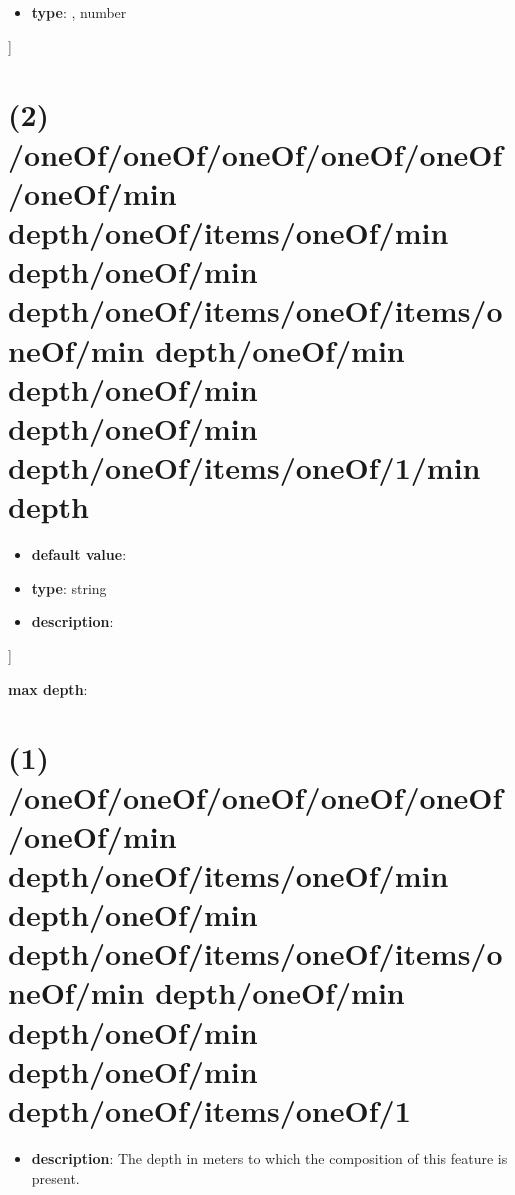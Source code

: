 \begin{itemize}[leftmargin=7em]\item {\bf type}: , number\end{itemize}]\section{(2) /oneOf/oneOf/oneOf/oneOf/oneOf/oneOf/min depth/oneOf/items/oneOf/min depth/oneOf/min depth/oneOf/items/oneOf/items/oneOf/min depth/oneOf/min depth/oneOf/min depth/oneOf/min depth/oneOf/items/oneOf/1/min depth}
\begin{itemize}[leftmargin=2em]\item {\bf default value}: 
\item {\bf type}: string
\item {\bf description}: 
\end{itemize}]\item {\bf max depth}: \section{(1) /oneOf/oneOf/oneOf/oneOf/oneOf/oneOf/min depth/oneOf/items/oneOf/min depth/oneOf/min depth/oneOf/items/oneOf/items/oneOf/min depth/oneOf/min depth/oneOf/min depth/oneOf/min depth/oneOf/items/oneOf/1}
\begin{itemize}[leftmargin=1em]\item {\bf description}: The depth in meters to which the composition of this feature is present.
\end{itemize}
